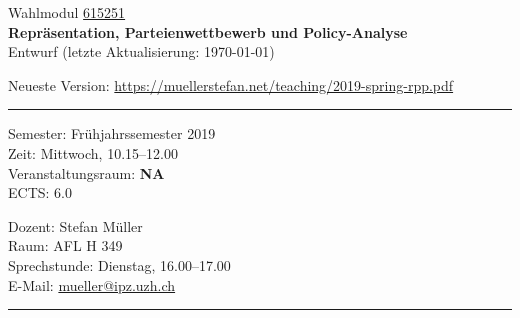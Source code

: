 \documentclass[abstract=on,parskip=full,headings=standardclasses,fontsize=11pt,paper=a4]{scrartcl}
\begin{document}
	
\singlespacing


\noindent
{}%
\hfill%

\singlespacing
\vspace{1cm}

\begin{center}
{\large Wahlmodul \href{https://studentservices.uzh.ch/uzh/anonym/vvz/index.html#/details/2018/004/E/50926420}{615251}} \\ 
\medskip
{\Large \textbf{Repräsentation, Parteienwettbewerb und Policy-Analyse}} \\
\bigskip
{\large  Entwurf (letzte Aktualisierung: \today)}

Neueste Version: \url{https://muellerstefan.net/teaching/2019-spring-rpp.pdf}
\end{center}

\vspace{1.5cm}

\hrule
\medskip
\begin{minipage}[t]{0.5\textwidth}
Semester: Frühjahrssemester 2019 \\
Zeit: Mittwoch, 10.15--12.00 \\
Veranstaltungsraum:  \textbf{NA}\\
ECTS: 6.0
\end{minipage}
\begin{minipage}[t]{0.5\textwidth}
\begin{flushright}
Dozent: Stefan Müller \\
Raum: AFL H 349\\
Sprechstunde: Dienstag, 16.00--17.00 \\
E-Mail: \textsf{\href{mailto:mueller@ipz.uzh.ch}{mueller@ipz.uzh.ch}}
\end{flushright}
\end{minipage}
\medskip
\vspace{2.5mm}
\hrule 
\end{document}
